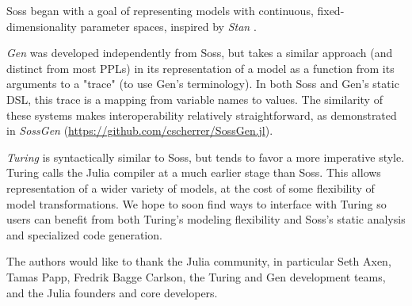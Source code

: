 \documentclass[anonymous=false, %
               format=acmsmall, %
               review=false, %
               screen=true, %
               nonacm=true]{acmart}
\begin{document}
Soss began with a goal of representing models with continuous, fixed-dimensionality parameter spaces, inspired by \emph{Stan} \cite{stan:2017}.

\emph{Gen} \cite{Cusumano-Towner:2019} was developed independently from Soss, but takes a similar approach (and distinct from most PPLs) in its representation of a model as a function from its arguments to a "trace" (to use Gen's terminology). In both Soss and Gen's static DSL, this trace is a mapping from variable names to values. The similarity of these systems makes interoperability relatively straightforward, as demonstrated in \emph{SossGen} (\url{https://github.com/cscherrer/SossGen.jl}). 

\emph{Turing} \cite{ge2018t} is syntactically similar to Soss, but tends to favor a more imperative style. Turing calls the Julia compiler at a much earlier stage than Soss. This allows representation of a wider variety of models, at the cost of some flexibility of model transformations. We hope to soon find ways to interface with Turing so users can benefit from both Turing's modeling flexibility and Soss's static analysis and specialized code generation.

\begin{acks}
The authors would like to thank the Julia community, in particular Seth Axen, Tamas Papp, Fredrik Bagge Carlson, the Turing and Gen development teams, and the Julia founders and core developers. 
\end{acks}




\appendix

\end{document}
